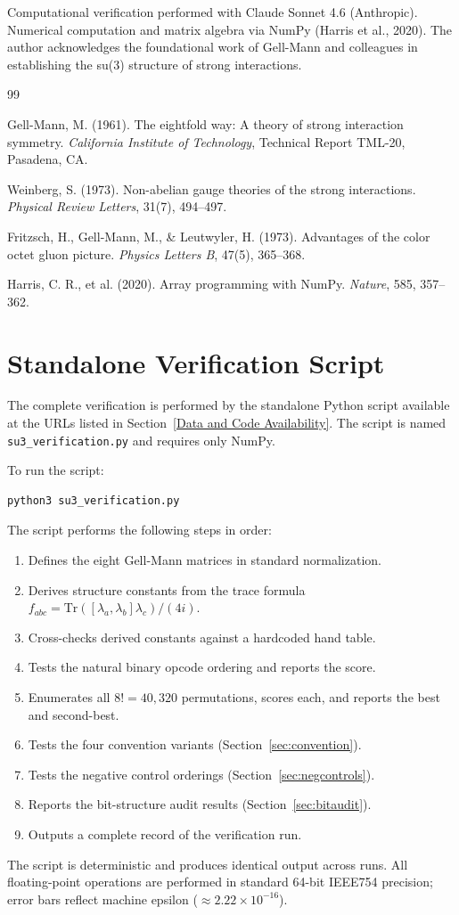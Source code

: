 \documentclass[11pt,a4paper]{article}
\begin{document}
Computational verification performed with Claude Sonnet 4.6 (Anthropic). Numerical computation and matrix algebra via NumPy (Harris et al., 2020). The author acknowledges the foundational work of Gell-Mann and colleagues in establishing the su(3) structure of strong interactions.

\begin{thebibliography}{99}

Gell-Mann, M. (1961). The eightfold way: A theory of strong interaction symmetry.
\textit{California Institute of Technology}, Technical Report TML-20, Pasadena, CA.

Weinberg, S. (1973). Non-abelian gauge theories of the strong interactions.
\textit{Physical Review Letters}, 31(7), 494--497.

Fritzsch, H., Gell-Mann, M., \& Leutwyler, H. (1973). Advantages of the color octet gluon picture.
\textit{Physics Letters B}, 47(5), 365--368.

Harris, C. R., et al. (2020). Array programming with NumPy.
\textit{Nature}, 585, 357--362.

\end{thebibliography}

\appendix

\section{Standalone Verification Script}

The complete verification is performed by the standalone Python script available at the URLs listed in Section~\ref*{Data and Code Availability}. The script is named \texttt{su3\_verification.py} and requires only NumPy.

To run the script:
\begin{lstlisting}[language=bash]
python3 su3_verification.py
\end{lstlisting}

The script performs the following steps in order:
\begin{enumerate}
  \item Defines the eight Gell-Mann matrices in standard normalization.
  \item Derives structure constants from the trace formula $f_{abc} = \text{Tr}([\lambda_a, \lambda_b] \lambda_c) / (4i)$.
  \item Cross-checks derived constants against a hardcoded hand table.
  \item Tests the natural binary opcode ordering and reports the score.
  \item Enumerates all $8! = 40,320$ permutations, scores each, and reports the best and second-best.
  \item Tests the four convention variants (Section~\ref{sec:convention}).
  \item Tests the negative control orderings (Section~\ref{sec:negcontrols}).
  \item Reports the bit-structure audit results (Section~\ref{sec:bitaudit}).
  \item Outputs a complete record of the verification run.
\end{enumerate}

The script is deterministic and produces identical output across runs. All floating-point operations are performed in standard 64-bit IEEE754 precision; error bars reflect machine epsilon ($\approx 2.22 \times 10^{-16}$).
\end{document}
